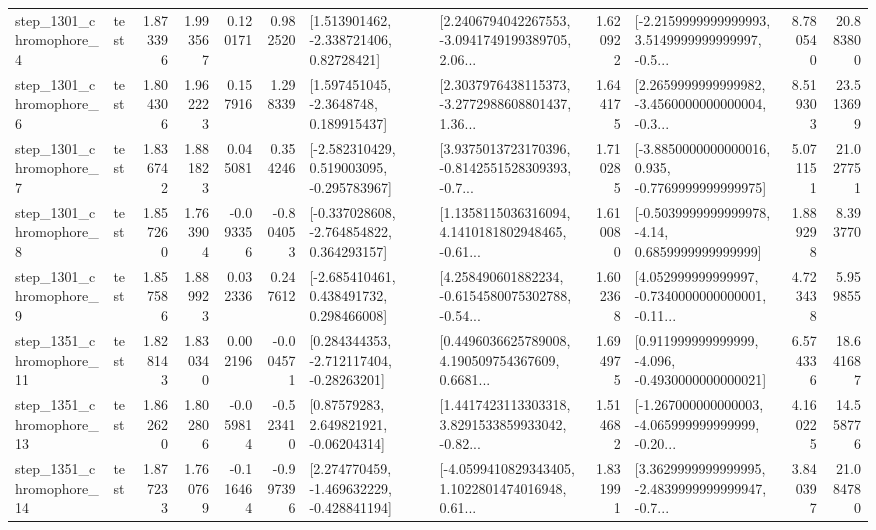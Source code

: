 \begin{tabular}{llrrrrllrlrr}
  step\_1301\_chromophore\_4 &      test &      1.873396 &    1.993567 &      0.120171 &  0.982520 &     [1.513901462, -2.338721406, 0.82728421] &  [2.2406794042267553, -3.0941749199389705, 2.06... &       1.620922 &  [-2.2159999999999993, 3.5149999999999997, -0.5... &            8.780540 &         20.883800 \\
  step\_1301\_chromophore\_6 &      test &      1.804306 &    1.962223 &      0.157916 &  1.298339 &      [1.597451045, -2.3648748, 0.189915437] &  [2.3037976438115373, -3.2772988608801437, 1.36... &       1.644175 &  [2.2659999999999982, -3.4560000000000004, -0.3... &            8.519303 &         23.513699 \\
  step\_1301\_chromophore\_7 &      test &      1.836742 &    1.881823 &      0.045081 &  0.354246 &   [-2.582310429, 0.519003095, -0.295783967] &  [3.9375013723170396, -0.8142551528309393, -0.7... &       1.710285 &  [-3.8850000000000016, 0.935, -0.7769999999999975] &            5.071151 &         21.027751 \\
  step\_1301\_chromophore\_8 &      test &      1.857260 &    1.763904 &     -0.093356 & -0.804053 &   [-0.337028608, -2.764854822, 0.364293157] &  [1.1358115036316094, 4.1410181802948465, -0.61... &       1.610080 &   [-0.5039999999999978, -4.14, 0.6859999999999999] &            1.889298 &          8.393770 \\
  step\_1301\_chromophore\_9 &      test &      1.857586 &    1.889923 &      0.032336 &  0.247612 &    [-2.685410461, 0.438491732, 0.298466008] &  [4.258490601882234, -0.6154580075302788, -0.54... &       1.602368 &  [4.052999999999997, -0.7340000000000001, -0.11... &            4.723438 &          5.959855 \\
 step\_1351\_chromophore\_11 &      test &      1.828143 &    1.830340 &      0.002196 & -0.004571 &    [0.284344353, -2.712117404, -0.28263201] &  [0.4496036625789008, 4.190509754367609, 0.6681... &       1.694975 &   [0.911999999999999, -4.096, -0.4930000000000021] &            6.574336 &         18.641687 \\
 step\_1351\_chromophore\_13 &      test &      1.862620 &    1.802806 &     -0.059814 & -0.523410 &      [0.87579283, 2.649821921, -0.06204314] &  [1.4417423113303318, 3.8291533859933042, -0.82... &       1.514682 &  [-1.267000000000003, -4.065999999999999, -0.20... &            4.160225 &         14.558776 \\
 step\_1351\_chromophore\_14 &      test &      1.877233 &    1.760769 &     -0.116464 & -0.997396 &   [2.274770459, -1.469632229, -0.428841194] &  [-4.0599410829343405, 1.1022801474016948, 0.61... &       1.831991 &  [3.3629999999999995, -2.4839999999999947, -0.7... &            3.840397 &         21.084780 \\

\end{tabular}
